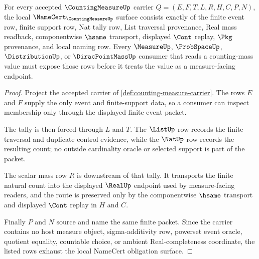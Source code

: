 \begin{theorem}
\label{thm:counting-measure-namecert-obligation-surface}
For every accepted $\CountingMeasureUp$ carrier $Q=(E,F,T,L,R,H,C,P,N)$, the local $\NameCert_{\CountingMeasureUp}$ surface consists exactly of the finite event row, finite support row, Nat tally row, List traversal provenance, Real mass readback, componentwise $\hsame$ transport, displayed $\Cont$ replay, $\Pkg$ provenance, and local naming row. Every $\MeasureUp$, $\ProbSpaceUp$, $\DistributionUp$, or $\DiracPointMassUp$ consumer that reads a counting-mass value must expose those rows before it treats the value as a measure-facing endpoint.
\end{theorem}
\begin{proof}
Project the accepted carrier of \autoref{def:counting-measure-carrier}. The rows $E$ and $F$ supply the only event and finite-support data, so a consumer can inspect membership only through the displayed finite event packet.

The tally is then forced through $L$ and $T$. The $\ListUp$ row records the finite traversal and duplicate-control evidence, while the $\NatUp$ row records the resulting count; no outside cardinality oracle or selected support is part of the packet.

The scalar mass row $R$ is downstream of that tally. It transports the finite natural count into the displayed $\RealUp$ endpoint used by measure-facing readers, and the route is preserved only by the componentwise $\hsame$ transport and displayed $\Cont$ replay in $H$ and $C$.

Finally $P$ and $N$ source and name the same finite packet. Since the carrier contains no host measure object, sigma-additivity row, powerset event oracle, quotient equality, countable choice, or ambient Real-completeness coordinate, the listed rows exhaust the local NameCert obligation surface.
\end{proof}

